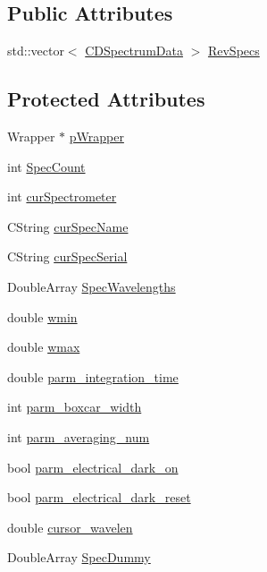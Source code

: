 \subsection*{Public Attributes}
\begin{DoxyCompactItemize}
\item 
std::vector$<$ \hyperlink{classCDSpectrumData}{CDSpectrumData} $>$ \hyperlink{classCSpectrometer_a75d6df9d683281a8390c425c3530e2a6}{RevSpecs}
\end{DoxyCompactItemize}
\subsection*{Protected Attributes}
\begin{DoxyCompactItemize}
\item 
Wrapper $\ast$ \hyperlink{classCSpectrometer_a54e4c92187f303ebb76ca6f8717ca644}{pWrapper}
\item 
int \hyperlink{classCSpectrometer_a681feb9200933a1a6a16002275442dfc}{SpecCount}
\item 
int \hyperlink{classCSpectrometer_a57be4704cd6c42cec4b6b256cde7fbde}{curSpectrometer}
\item 
CString \hyperlink{classCSpectrometer_a35456e3a5eba64cf5d42a8d5d91605cd}{curSpecName}
\item 
CString \hyperlink{classCSpectrometer_ac21a2d3d07dac2d7d64db3401b7f9373}{curSpecSerial}
\item 
DoubleArray \hyperlink{classCSpectrometer_abb04ee8adc4b30350e23f00aea799dec}{SpecWavelengths}
\item 
double \hyperlink{classCSpectrometer_a82f43ea9e9294a0e5f4f5609464db845}{wmin}
\item 
double \hyperlink{classCSpectrometer_a2baa66aaecaf486e610e352a89799609}{wmax}
\item 
double \hyperlink{classCSpectrometer_a2b113a0eb67d6581327fa4193c3af699}{parm\_\-integration\_\-time}
\item 
int \hyperlink{classCSpectrometer_a4fd7d950c220dd44033c4fe3a992e7a0}{parm\_\-boxcar\_\-width}
\item 
int \hyperlink{classCSpectrometer_a55d75756399a14fe1074e14551628f4d}{parm\_\-averaging\_\-num}
\item 
bool \hyperlink{classCSpectrometer_a48ecc7e901f3e07f4c280266f0130124}{parm\_\-electrical\_\-dark\_\-on}
\item 
bool \hyperlink{classCSpectrometer_a896f74cc1936017bb5189d43d8c27f6f}{parm\_\-electrical\_\-dark\_\-reset}
\item 
double \hyperlink{classCSpectrometer_ae0b5232a08194d9520ca56df395377ed}{cursor\_\-wavelen}
\item 
DoubleArray \hyperlink{classCSpectrometer_ac04b2fce0185a9c84cb6f636e36a4f8b}{SpecDummy}
\end{DoxyCompactItemize}


